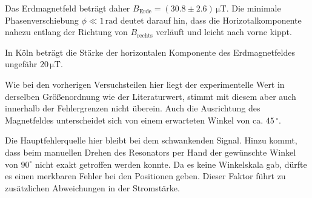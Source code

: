 \documentclass[12pt,a4paper]{scrartcl}
\numberwithin{equation}{section} %
\begin{document}
\noindent
Das Erdmagnetfeld beträgt daher $B_\mathrm{Erde} = (30.8 \pm 2.6) \mathrm{\,\mu T}$. Die minimale Phasenverschiebung $\phi \ll 1\mathrm{\,rad}$ deutet darauf hin, dass die Horizotalkomponente nahezu entlang der Richtung von $B_\mathrm{rechts}$ verläuft und leicht nach vorne kippt.

In Köln beträgt die Stärke der horizontalen Komponente des Erdmagnetfeldes ungefähr $20 \mathrm{\,\mu T}$. \cite{Erdmagnetfeld}

Wie bei den vorherigen Versuchsteilen hier liegt der experimentelle Wert in derselben Größenordnung wie der Literaturwert, stimmt mit diesem aber auch innerhalb der Fehlergrenzen nicht überein. Auch die Ausrichtung des Magnetfeldes unterscheidet sich von einem erwarteten Winkel von ca. $45\,^\circ $.

Die Hauptfehlerquelle hier bleibt bei dem schwankenden Signal. Hinzu kommt, dass beim manuellen Drehen des Resonators per Hand der gewünschte Winkel von $90^{\circ} $ nicht exakt getroffen werden konnte. Da es keine Winkelskala gab, dürfte es einen merkbaren Fehler bei den Positionen geben. Dieser Faktor führt zu zusätzlichen Abweichungen in der Stromstärke.
\end{document}
